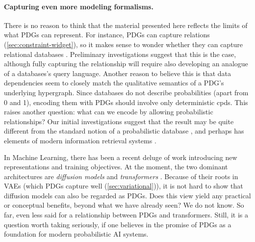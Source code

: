 \paragraph{Capturing even more modeling formalisms.}
There is no reason to think that the material presented here reflects the limits of what PDGs can represent. 
%
For instance, PDGs can capture relations (\cref{sec:constraint-widget}), so it makes sense to wonder whether they can capture relational databases
    \citep{abiteboul1995foundations}. 
Preliminary investigations suggest that this is the case,
    although fully capturing the relationship will require also developing an analogue of a databases's query language.  
Another reason to believe this is that data dependencies \citep{fagin1986theory} seem to closely match the qualitative semantics of a PDG's underlying hypergraph. 
Since databases do not describe probabilities (apart from 0 and 1), 
    encoding them with PDGs should involve only deterministic cpds.
This raises another question: what can we encode by allowing probabilistic relationships?
Our initial investigations suggest that the result may be quite different from the standard notion of a probabilistic database \citep{suciu2011probabilistic}, and perhaps has elements of modern information retrieval systems \citep{mitra-neural-info-retrieval,karpukhin2020dense}.
%
%

In Machine Learning, there has been a recent deluge of work introducing new representations and training objectives. At the moment, the two dominant architectures are \emph{diffusion models} \citep{pmlr-v37-sohl-dickstein15,ho2020denoising} and \emph{transformers} \citep{vaswani-attn}. 
Because of their roots in VAEs (which PDGs capture well (\cref{sec:variational})), it is not hard to show that diffusion models can also be regarded as PDGs. %
    Does this view yield any practical or conceptual benefits, beyond what we have already seen? 
    We do not know.
%
So far, even less said for a relationship between PDGs and transformers.
Still, it is a question worth taking seriously, if one believes in the promise of PDGs as a foundation for modern probabilistic AI systems.      

